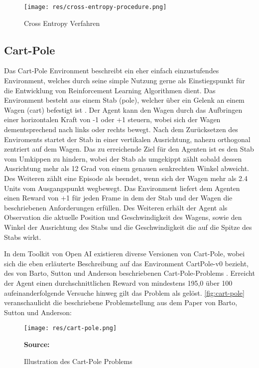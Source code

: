 \documentclass[11pt]{scrartcl}
\newcommand{\source}[1]{\vspace{-5pt} \caption*{\hfill \textbf{Source:} {#1}} }
\begin{document}
\begin{figure}[htp]
\centering
\texttt{[image: res/cross-entropy-procedure.png]}
\caption{Cross Entropy Verfahren}
\label{fig:cross_entropy_procedure}
\end{figure}

\subsection{Cart-Pole}
Das Cart-Pole Environment beschreibt ein eher einfach einzustufendes Environment, welches durch seine
simple Nutzung gerne als Einstiegspunkt für die Entwicklung von Reinforcement Learning Algorithmen 
dient. Das Environment besteht aus einem Stab (pole), welcher über ein Gelenk an einem Wagen (cart) 
befestigt ist \cite{OAI2016_2}. Der Agent kann den Wagen durch das Aufbringen einer horizontalen Kraft 
von -1 oder +1 steuern, wobei sich der Wagen dementsprechend nach links oder rechts bewegt. Nach 
dem Zurücksetzen des Enviroments startet der Stab in einer vertikalen Ausrichtung, nahezu orthogonal
zentriert auf dem Wagen. Das zu erreichende Ziel für den Agenten ist es den Stab vom Umkippen zu hindern,
wobei der Stab als umgekippt zählt sobald dessen Ausrichtung mehr als 12 Grad von einem genauen
senkrechten Winkel abweicht. Des Weiteren zählt eine Episode als beendet, wenn sich der Wagen mehr
als 2.4 Units vom Ausgangspunkt wegbewegt. Das Environment liefert dem Agenten einen Reward von +1
für jeden Frame in dem der Stab und der Wagen die beschriebenen Anforderungen erfüllen. Des Weiteren
erhält der Agent als Observation die aktuelle Position und Geschwindigkeit des Wagens, sowie den Winkel
der Ausrichtung des Stabs und die Geschwindigkeit die auf die Spitze des Stabs wirkt.

In dem Toolkit von Open AI existieren diverse Versionen von Cart-Pole, wobei sich die eben
erläuterte Beschreibung auf das Environment CartPole-v0 bezieht, des von Barto, Sutton und
Anderson beschriebenen Cart-Pole-Problems \cite[~S.838 f.]{BSA1983}. Erreicht der Agent einen
durchschnittlichen Reward von mindestens 195,0 über 100 aufeinanderfolgende Versuche hinweg gilt das
Problem als gelöst. \autoref{fig:cart-pole} veranschaulicht die beschriebene Problemstellung aus dem 
Paper\cite{BSA1983} von Barto, Sutton und Anderson:

\begin{figure}[htp]
\centering
\texttt{[image: res/cart-pole.png]}
\caption{Illustration des Cart-Pole Problems}
\source{\cite[~S.838]{BSA1983}}
\label{fig:cart-pole}
\end{figure}
\end{document}
